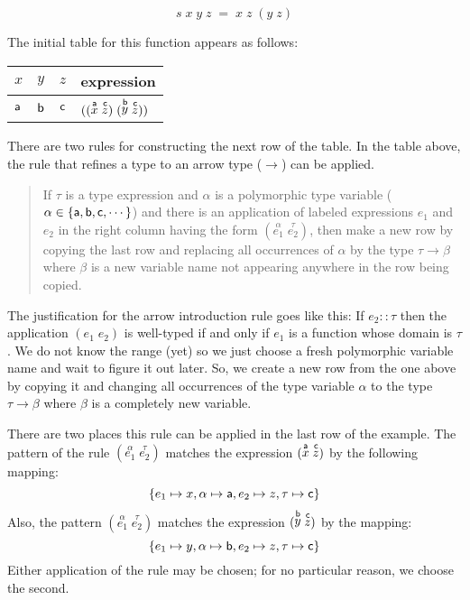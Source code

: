 \documentclass[11pt]{article}
\begin{document}
\[  s\; x\;y \; z\;=\; x\;z\;(y\;z) \]

The initial table for this function appears as follows:

\begin{center}
\begin{tabular}{lll|l}
$x$ & $y$ & $z$ & expression \\\hline{}
${\sf{a}}$ & ${\sf{b}}$ & ${\sf{c}}$ &$((\stackrel{{\sf{a}}}{x} \; \stackrel{{\sf{c}}}{z})\; (\stackrel{{\sf{b}}}{y} \; \stackrel{{\sf{c}}}{z}))$ \\
\end{tabular}
\end{center}

There are two rules for constructing the next row of the table.  In the table
above, the rule that refines a type to an arrow type ($\rightarrow$) can be
applied.

\begin{quotation}
 If $\tau$ is a type expression and
$\alpha$ is a polymorphic type variable ($\alpha\in\{{\sf{a}},{\sf{b}},{\sf{c}},\cdots\}$)
and there is an application of labeled expressions $e_1$ and $e_2$ in the right
column having the form $(\stackrel{\alpha}{e_1}\;\stackrel{\tau}{e_2})$, then
make a new row by copying the last row and replacing all occurrences of
$\alpha$ by the type $\tau\rightarrow{}\beta$ where $\beta$ is a new variable
name not appearing anywhere in the row being copied.
\end{quotation}

The justification for the arrow introduction rule goes like this: If
$e_2::\tau$ then the application $(e_1\;e_2)$ is well-typed if and only if
$e_1$ is a function whose domain is $\tau$.  We do not know the range (yet) so
we just choose a fresh polymorphic variable name and wait to figure it out
later.  So, we create a new row from the one above by copying it and changing
all occurrences of the type variable $\alpha$ to the type
$\tau\rightarrow{}\beta$ where $\beta$ is a completely new variable.

There are two places this rule can be applied in the last row of the
example. The pattern of the rule
$(\stackrel{\alpha}{e_1}\;\stackrel{\tau}{e_2})$ matches the expression
$(\stackrel{{\sf{a}}}{x}\;\stackrel{{\sf{c}}}{z})$ by the following mapping:
\[\{e_1\mapsto{}x, \alpha\mapsto{\sf{a}}, e_2\mapsto{}z,\tau\mapsto{\sf{c}}\}\]
Also, the pattern $(\stackrel{\alpha}{e_1}\;\stackrel{\tau}{e_2})$ matches the
expression $(\stackrel{{\sf{b}}}{y}\;\stackrel{{\sf{c}}}{z})$ by the mapping:
\[\{e_1\mapsto{}y,\alpha\mapsto{\sf{b}},e_2\mapsto{}z,  \tau\mapsto{\sf{c}}\}\]
Either application of the rule may be chosen; for no particular reason, we
choose the second.
\end{document}

